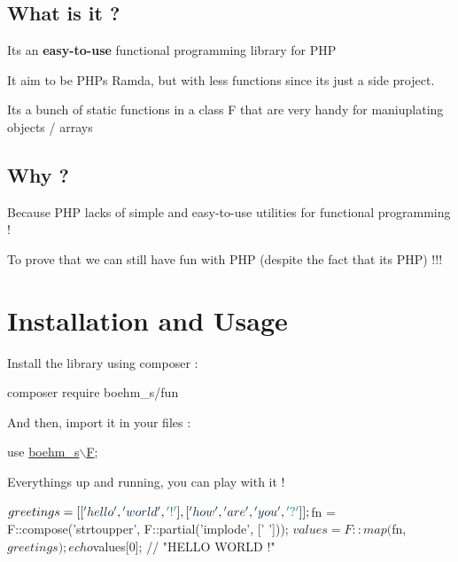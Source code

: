 \subsection*{What is it ?}


\begin{DoxyItemize}
\item It\textquotesingle{}s an {\bfseries easy-\/to-\/use} functional programming library for P\+HP
\item It aim to be P\+HP\textquotesingle{}s Ramda, but with less functions since it\textquotesingle{}s just a side project.
\item It\textquotesingle{}s a bunch of static functions in a class {\ttfamily F} that are very handy for maniuplating objects / arrays
\end{DoxyItemize}

\subsection*{Why ?}


\begin{DoxyItemize}
\item Because P\+HP lacks of simple and easy-\/to-\/use utilities for functional programming !
\item To prove that we can still have fun with P\+HP (despite the fact that it\textquotesingle{}s P\+HP) !!!
\end{DoxyItemize}

\section*{Installation and Usage}

Install the library using composer \+:


\begin{DoxyCode}
composer require boehm\_s/fun
\end{DoxyCode}


And then, import it in your files \+:


\begin{DoxyCode}
use \hyperlink{classboehm__s_1_1F}{boehm\_s\(\backslash\)F};
\end{DoxyCode}


Everything\textquotesingle{}s up and running, you can play with it !


\begin{DoxyCode}
$greetings = [
    [\textcolor{stringliteral}{'hello'}, \textcolor{stringliteral}{'world'}, \textcolor{charliteral}{'!'}],
    [\textcolor{stringliteral}{'how'}, \textcolor{stringliteral}{'are'}, \textcolor{stringliteral}{'you'}, \textcolor{charliteral}{'?'}]
];

$fn = F::compose(\textcolor{stringliteral}{'strtoupper'}, F::partial(\textcolor{stringliteral}{'implode'}, [\textcolor{charliteral}{' '}]));
$values = F::map($fn, $greetings);

echo $values[0]; \textcolor{comment}{// "HELLO WORLD !"}
\end{DoxyCode}


